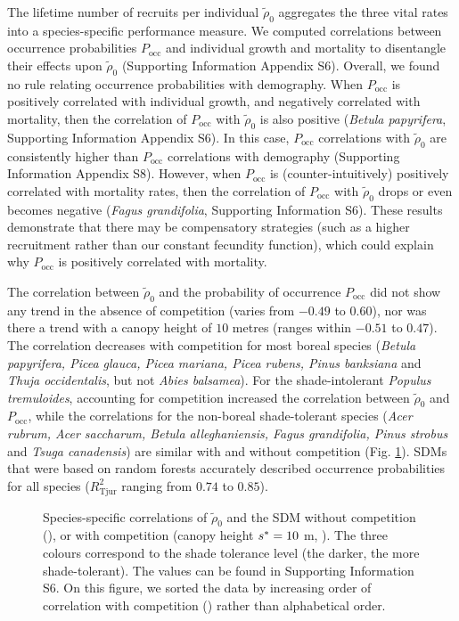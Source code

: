 The lifetime number of recruits per individual $ \tilde \rho_0 $ aggregates the three vital rates into a species-specific performance measure. We computed correlations between occurrence probabilities $ P_{\text{occ}} $ and individual growth and mortality to disentangle their effects upon $ \tilde \rho_0 $ (Supporting Information Appendix S6). Overall, we found no rule relating occurrence probabilities with demography. When $ P_{\text{occ}} $ is positively correlated with individual growth, and negatively correlated with mortality, then the correlation of $ P_{\text{occ}} $ with $ \tilde \rho_0 $ is also positive (\eg \textit{Betula papyrifera}, Supporting Information Appendix S6). In this case, $ P_{\text{occ}} $ correlations with $ \tilde \rho_0 $ are consistently higher than $ P_{\text{occ}} $ correlations with demography (Supporting Information Appendix S8). However, when $ P_{\text{occ}} $ is (counter-intuitively) positively correlated with mortality rates, then the correlation of $ P_{\text{occ}} $ with $ \tilde \rho_0 $ drops or even becomes negative (\eg \textit{Fagus grandifolia}, Supporting Information S6). These results demonstrate that there may be compensatory strategies (such as a higher recruitment rather than our constant fecundity function), which could explain why $ P_{\text{occ}} $ is positively correlated with mortality.

The correlation between $ \tilde \rho_0 $ and the probability of occurrence $ P_{\text{occ}} $ did not show any trend in the absence of competition (varies from $ - 0.49 $ to $ 0.60 $), nor was there a trend with a canopy height of $ 10 $ metres (ranges within $ - 0.51 $ to $ 0.47 $). The correlation decreases with competition for most boreal species (\textit{Betula papyrifera, Picea glauca, Picea mariana, Picea rubens, Pinus banksiana} and \textit{Thuja occidentalis}, but not \textit{Abies balsamea}). For the shade-intolerant \textit{Populus tremuloides}, accounting for competition increased the correlation between $ \tilde \rho_0 $ and $ P_{\text{occ}} $, while the correlations for the non-boreal shade-tolerant species (\textit{Acer rubrum, Acer saccharum, Betula alleghaniensis, Fagus grandifolia, Pinus strobus} and \textit{Tsuga canadensis}) are similar with and without competition (Fig. \ref{fig::3correls}). SDMs that were based on random forests accurately described occurrence probabilities for all species ($ R_{\text{Tjur}}^2 $ ranging from $ 0.74 $ to $ 0.85 $).
\begin{figure}
	\centering
	
	\caption{Species-specific correlations of $ \tilde \rho_0 $ and the SDM without competition (\MoveUp), or with competition (canopy height $ {s}^{*} = 10 $ m, \CircSteel). The three colours correspond to the shade tolerance level (the darker, the more shade-tolerant). The values can be found in Supporting Information S6. On this figure, we sorted the data by increasing order of correlation with competition (\CircSteel) rather than alphabetical order. \label{fig::3correls}}
\end{figure}
